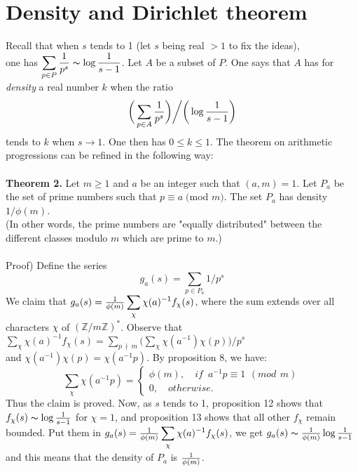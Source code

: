 \documentclass[11pt]{article}
\begin{document}
\section{Density and Dirichlet theorem}
Recall that when $s$ tends to 1 (let $s$ being real $>1$ to fix the ideas),
\\
one has $\displaystyle\sum_{p\in P}{1\over p^s}\thicksim \log{1\over s-1}$. Let $A$ be a subset of $P$. One says that $A$ has for \textit{density} a real number $k$ when the ratio
\begin{equation*}
\bigg(\displaystyle\sum_{p\in A}{1\over p^s}\bigg) \bigg/ \bigg(\log{1\over s-1}\bigg)
\end{equation*}
tends to $k$ when $s\to 1$. One then has $0\leq k \leq 1$. The theorem on arithmetic progressions can be refined in the following way:
\\
\\
\textbf{Theorem 2.}
Let $m\geq1$ and $a$ be an integer such that $(a, m)=1$. Let $P_a$ be the set of prime numbers such that $p\equiv a\; ($mod $m)$. The set $P_a$ has density $1/\phi(m)$.
\\
(In other words, the prime numbers are "equally distributed" between the different classes modulo $m$ which are prime to $m$.)
\\
\\
Proof) Define the series
\begin{equation*}
g_a (s)=\displaystyle\sum_{p\in P_a} 1/p^s
\end{equation*}
We claim that $g_a (s)={1\over \phi(m)}\displaystyle\sum_{\chi}\chi(a)^{-1}f_\chi(s)$, where the sum extends over all characters $\chi$ of $(\mathbb{Z}/m\mathbb{Z})^*$. Observe that $\displaystyle\sum_{\chi}\chi(a)^{-1}f_\chi(s)=\displaystyle\sum_{p\:\nmid\: m}\Big(\displaystyle\sum_{\chi}\chi(a^{-1})\chi(p)\Big)/p^s$
\\
and $\chi(a^{-1})\chi(p)=\chi(a^{-1}p)$. By proposition 8, we have:
\begin{equation*}
    \displaystyle\sum_{\chi} \chi(a^{-1}p)=\left \{\begin{array}{l}
    \phi(m),\quad if \;\: a^{-1}p\equiv 1\:\, (mod\:\, m) \\
    0,\quad otherwise. 
    \end{array}
    \right.
\end{equation*}
Thus the claim is proved. Now, as $s$ tends to 1, proposition 12 shows that $f_{\chi}(s) \thicksim \log{1\over s-1}$ for $\chi=1$, and proposition 13 shows that all other $f_\chi$ remain bounded. Put them in $g_a (s)={1\over \phi(m)}\displaystyle\sum_{\chi}\chi(a)^{-1}f_\chi(s)$, we get $g_a(s)\thicksim {1\over \phi(m)}\log{1 \over s-1}$ and this means that the density of $P_a$ is ${1\over \phi(m)}$.
\end{document}
